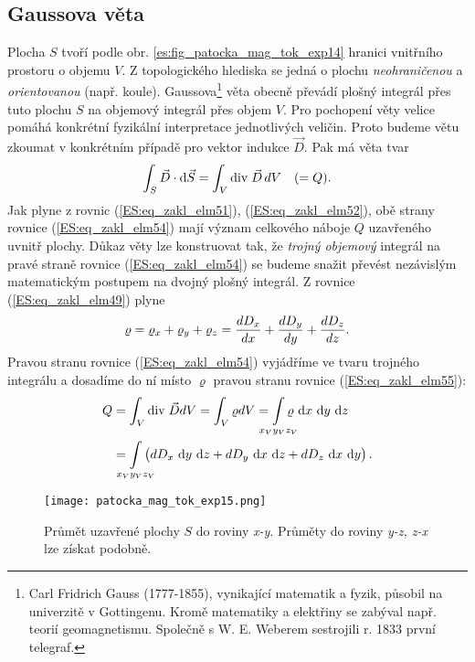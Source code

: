    \subsection{Gaussova věta}
      Plocha \(S\) tvoří podle obr. \ref{es:fig_patocka_mag_tok_exp14} hranici vnitřního prostoru o 
      objemu \(V\). Z topologického hlediska se jedná o plochu \emph{neohraničenou} a 
      \emph{orientovanou} (např. koule). Gaussova\footnote{Carl Fridrich Gauss (1777-1855), 
      vynikající matematik a fyzik, působil na univerzitě v Gottingenu. Kromě matematiky a 
      elektřiny se zabýval např. teorií geomagnetismu. Společně s W. E. Weberem sestrojili r. 1833 
      první telegraf.}  věta obecně převádí plošný integrál přes tuto plochu \(S\) na objemový 
      integrál přes objem \(V\). Pro pochopení věty velice pomáhá konkrétní fyzikální interpretace 
      jednotlivých veličin. Proto budeme větu zkoumat v konkrétním případě pro vektor indukce 
      \(\vec{D}\). Pak má věta tvar
      \begin{equation}\label{ES:eq_zakl_elm54}
        \int_S\vec{D}\cdot \mathop{}\!\mathrm{d}\vec{S} = \int_V\mathrm{div}\;\vec{D}\,dV \quad(=Q).
      \end{equation} 
      Jak plyne z rovnic (\ref{ES:eq_zakl_elm51}), (\ref{ES:eq_zakl_elm52}), obě strany rovnice 
      (\ref{ES:eq_zakl_elm54}) mají význam celkového náboje \(Q\) uzavřeného uvnitř plochy. Důkaz 
      věty lze konstruovat tak, že \emph{trojný objemový} integrál na pravé straně rovnice 
      (\ref{ES:eq_zakl_elm54}) se budeme snažit převést nezávislým matematickým postupem na dvojný 
      plošný integrál. Z rovnice (\ref{ES:eq_zakl_elm49}) plyne
      \begin{equation}\label{ES:eq_zakl_elm55}
        \varrho = \varrho_x + \varrho_y + \varrho_z 
                = \dfrac{d D_x}{d x} + \dfrac{d D_y}{d y} + \dfrac{d D_z}{d z}. 
      \end{equation}
      Pravou stranu rovnice (\ref{ES:eq_zakl_elm54}) vyjádříme ve tvaru trojného integrálu a 
      dosadíme do ní místo \(\varrho\) pravou stranu rovnice (\ref{ES:eq_zakl_elm55}):
      \begin{align}\label{ES:eq_zakl_elm56}
        Q &= \int_V\diver{D}dV = \int_V\varrho dV 
           = \limitint_{\mathclap{x_Vy_Vz_V}}\varrho\,\dd{x}\,\dd{y}\,\dd{z}   \nonumber\\
          &= \limitint_{\mathclap{x_Vy_Vz_V}}\left(dD_x\,\dd{y}\,\dd{z}+dD_y\,\dd{x}\,\dd{z}+dD_z\,\dd{x}\,\dd{y}\right).
      \end{align}      
      \begin{figure}[ht!]
        \centering
        \texttt{[image: patocka\_mag\_tok\_exp15.png]}
        \caption{Průmět uzavřené plochy \(S\) do roviny \emph{x-y}. Průměty do roviny \emph{y-z, 
                 z-x} lze získat podobně.}
        \label{es:fig_patocka_mag_tok_exp15}
      \end{figure}
